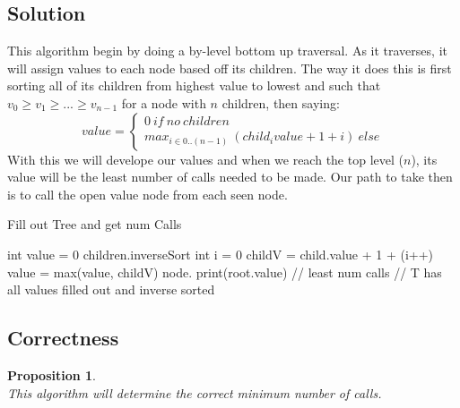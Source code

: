 \documentclass[12pt]{article}
\newtheorem{proposition}[theorem]{Proposition}
\begin{document}

\subsection{Solution}
This algorithm begin by doing a by-level bottom up traversal. As it traverses, it will
assign values to each node based off its children. The way it does this is first sorting
all of its children from highest value to lowest and such that $v_0 \geq v_1 \geq ... \geq v_{n-1}$ for
a node with $n$ children, then saying:
\[ value =
\begin{cases}
    0\ if\ no\ children \\
    max_{i \in 0..(n-1)}\ (child_{i}value + 1 + i)\ else
\end{cases}
\]
With this we will develope our values and when we reach the top level ($n$), its value
will be the least number of calls needed to be made. Our path to take then is to call
the open value node from each seen node.

\begin{algorithm}[H]
\caption{Fill out Tree and get num Calls}
\begin{algorithmic}
                \State int value = 0
                    \State children.inverseSort
                    \State int i = 0
                        \State childV = child.value + 1 + (i++)
                        \State value = max(value, childV)
                    \EndFor
                \EndIf
                \State node.
            \EndFor
        \EndFor
        \State print(root.value)  // least num calls
        \State {} // T has all values filled out and inverse sorted
    \EndProcedure
\end{algorithmic}
\end{algorithm}


\newpage
\subsection{Correctness}
\begin{proposition}
~ \\ \indent This algorithm will determine the correct minimum number of calls.
\end{proposition}
\end{document}
